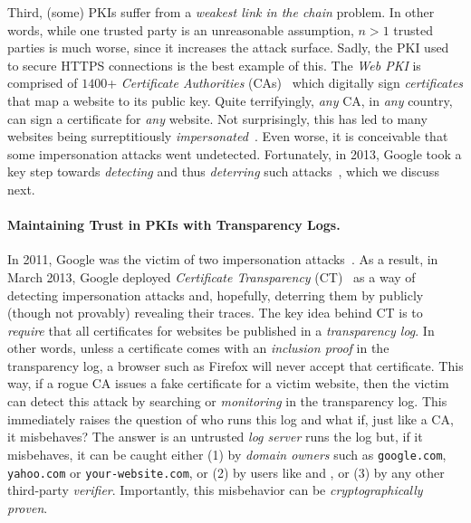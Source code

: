 Third, (some) PKIs suffer from a \textit{weakest link in the chain} problem.
In other words, while one trusted party is an unreasonable assumption, $n>1$ trusted parties is much worse, since it increases the attack surface.
Sadly, the PKI used to secure HTTPS connections is the best example of this.
The \textit{Web PKI} is comprised of $1400$+ \textit{Certificate Authorities} (CAs)~\cite{ssliverse-talk} which digitally sign \textit{certificates} that map a website to its public key.
Quite terrifyingly, \textit{any} CA, in \textit{any} country, can sign a certificate for \textit{any} website.
Not surprisingly, this has led to many websites being surreptitiously \textit{impersonated}~\cite{cahacks,cahacksurvey}.
Even worse, it is conceivable that some impersonation attacks went undetected.
Fortunately, in 2013, Google took a key step towards \textit{detecting} and thus \textit{deterring} such attacks~\cite{ct}, which we discuss next.

\paragraph{Maintaining Trust in PKIs with Transparency Logs.}
In 2011, Google was the victim of two impersonation attacks~\cite{mitmgoogle,mitmgoogle2}.
As a result, in March 2013, Google deployed \textit{Certificate Transparency} (CT)~\cite{ct} as a way of detecting impersonation attacks and, hopefully, deterring them by publicly (though not provably) revealing their traces.
The key idea behind CT is to \textit{require} that all certificates for websites be published in a \textit{transparency log}.
In other words, unless a certificate comes with an \textit{inclusion proof} in the transparency log, a browser such as Firefox will never accept that certificate.
This way, if a rogue CA issues a fake certificate for a victim website, then the victim can detect this attack by searching or \textit{monitoring} in the transparency log.
This immediately raises the question of who runs this log and what if, just like a CA, it misbehaves?
The answer is an untrusted \textit{log server} runs the log but, if it misbehaves, it can be caught either (1) by \textit{domain owners}  such as \texttt{google.com},  \texttt{yahoo.com} or \texttt{your-website.com}, or (2) by users like \alice and \bob, or (3) by any other third-party \textit{verifier}.
Importantly, this misbehavior can be \textit{cryptographically proven}.

